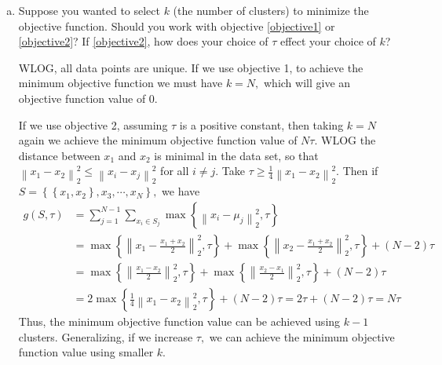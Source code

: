 \documentclass{article}
\begin{document}
\begin{enumerate}[(a)]
		\item Suppose you wanted to select $k$ (the number of clusters) to minimize the objective function. Should you work with objective \ref{objective1} or \ref{objective2}? If \ref{objective2}, how does your choice of $\tau$ effect your choice of $k$?
			\begin{soln}
				WLOG, all data points are unique. If we use objective 1, to achieve the minimum objective function we must have $k=N,$ which will give an objective function value of 0.

				If we use objective 2, assuming $\tau$ is a positive constant, then taking $k=N$ again we achieve the minimum objective function value of $N\tau.$ WLOG the distance between $x_1$ and $x_2$ is minimal in the data set, so that $\left\lVert x_1-x_2 \right\rVert_2^2 \le \left\lVert x_i-x_j \right\rVert_2^2$ for all $i\neq j.$ Take $\tau\ge\frac{1}{4}\left\lVert x_1-x_2 \right\rVert_2^2.$ Then if $S=\left\{ \left\{ x_1, x_2 \right\}, x_3, \cdots, x_N \right\},$ we have
				\begin{align*}
					g(S, \tau) &= \sum_{j=1}^{N-1} \sum_{x_i\in S_j}^{}\max\left\{ \left\lVert x_i-\mu_j \right\rVert_2^2, \tau \right\} \\
					&= \max\left\{ \left\lVert x_1-\frac{x_1+x_2}{2} \right\rVert_2^2, \tau \right\} + \max\left\{ \left\lVert x_2-\frac{x_1+x_2}{2} \right\rVert_2^2, \tau \right\} + (N-2)\tau \\
					&= \max\left\{ \left\lVert \frac{x_1-x_2}{2} \right\rVert_2^2, \tau \right\} + \max\left\{ \left\lVert \frac{x_2-x_1}{2} \right\rVert_2^2, \tau \right\} + (N-2)\tau \\
					&= 2\max\left\{ \frac{1}{4}\left\lVert x_1-x_2 \right\rVert_2^2, \tau \right\} + (N-2)\tau = 2\tau + (N-2)\tau = N\tau
				\end{align*}
				Thus, the minimum objective function value can be achieved using $k-1$ clusters. Generalizing, if we increase $\tau,$ we can achieve the minimum objective function value using smaller $k.$
			\end{soln}
	\end{enumerate}


	
\end{document}
